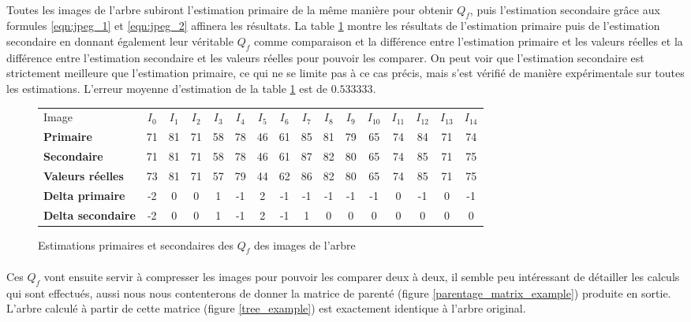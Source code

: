 \documentclass[utf8,final]{stageM2R} %
\begin{document}
\paragraph{}
Toutes les images de l'arbre subiront l'estimation primaire de la même manière pour obtenir $Q_f$, puis l'estimation secondaire grâce aux formules \ref{eqn:jpeg_1} et \ref{eqn:jpeg_2} affinera les résultats. La table \ref{rough_fine} montre les résultats de l'estimation primaire puis de l'estimation secondaire en donnant également leur véritable $Q_f$ comme comparaison et la différence entre l'estimation primaire et les valeurs réelles et la différence entre l'estimation secondaire et les valeurs réelles pour pouvoir les comparer. On peut voir que l'estimation secondaire est strictement meilleure que l'estimation primaire, ce qui ne se limite pas à ce cas précis, mais s'est vérifié de manière expérimentale sur toutes les estimations. L'erreur moyenne d'estimation de la table \ref{rough_fine} est de $0.533333$.

\begin{figure}
  \begin{tabular}{|l||c|c|c|c|c|c|c|c|c|c|c|c|c|c|c|}
    \hline
    Image & $I_{0}$ & $I_{1}$ & $I_{2}$ & $I_{3}$ & $I_{4}$ & $I_{5}$ & $I_{6}$ & $I_{7}$ & $I_{8}$ & $I_{9}$ & $I_{10}$ & $I_{11}$ & $I_{12}$ & $I_{13}$ & $I_{14}$ \\ \hhline{|=::=|=|=|=|=|=|=|=|=|=|=|=|=|=|=|}
   
    \textbf{Primaire}  & 71 & 81 & 71 & 58 & 78 & 46 & 61 & 85 & 81 & 79 & 65 & 74 & 84 & 71 & 74 \\ \hline
    \textbf{Secondaire} & 71 & 81 & 71 & 58 & 78 & 46 & 61 & 87 & 82 & 80 & 65 & 74 & 85 & 71 & 75 \\ \hline
    \textbf{Valeurs réelles} & 73 & 81 & 71 & 57 & 79 & 44 & 62 & 86 & 82 & 80 & 65 & 74 & 85 & 71 & 75 \\ \hhline{|=::=|=|=|=|=|=|=|=|=|=|=|=|=|=|=|}
    \textbf{Delta primaire} & -2 & 0 & 0 & 1 & -1 & 2 & -1 & -1 & -1 & -1 & -1 & 0 & -1 & 0 & -1 \\ \hline
    \textbf{Delta secondaire} & -2 & 0 & 0 & 1 & -1 & 2 & -1 & 1 & 0 & 0 & 0 & 0 & 0 & 0 & 0 \\ \hline
  \end{tabular}

  \caption{Estimations primaires et secondaires des $Q_f$ des images de l'arbre}
  \label{rough_fine}
\end{figure}

\paragraph{}
Ces $Q_f$ vont ensuite servir à compresser les images pour pouvoir les comparer deux à deux, il semble peu intéressant de détailler les calculs qui sont effectués, aussi nous nous contenterons de donner la matrice de parenté (figure \ref{parentage_matrix_example}) produite en sortie. L'arbre calculé à partir de cette matrice (figure \ref{tree_example}) est exactement identique à l'arbre original.
\end{document}
